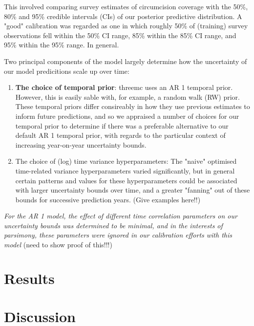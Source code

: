 \documentclass{article}
\begin{document}
This involved comparing survey estimates of circumcision coverage with the 50\%, 80\% and 95\% credible intervals (CIs) of our posterior predictive distribution. A "good" calibration
was regarded as one in which roughly 50\% of (training) survey observations fell within the 50\% CI range, 85\% within the 85\% CI range, and 95\% within the 95\% range. In general.

Two principal components of the model largely determine how the uncertainty of our model predicitions scale up over time: 
\begin{enumerate}
\item \textbf{The choice of temporal prior}: threemc uses an AR 1 temporal prior. However, this is easily sable with, for example, a random walk (RW) prior. These temporal priors
differ consireably in how they use previous estimates to inform future predictions, and so we appraised a number of choices for our temporal prior to determine if there
was a preferable alternative to our default AR 1 temporal prior, with regards to the particular context of increasing year-on-year uncertainty bounds.
\item The choice of (log) time variance hyperparameters: The "naive" optimised time-related variance hyperparameters varied significantly, but in general certain patterns and values
for these hyperparameters could be associated with larger uncertainty bounds over time, and a greater "fanning" out of these bounds for successive prediction years. (Give
examples here!!)
\end{enumerate}

\emph{For the AR 1 model, the effect of different time correlation parameters on our uncertainty bounds was determined to be minimal, and in the interests of parsimony, these parameters were}
\emph{ignored in our calibration efforts with this model} (need to show proof of this!!!)

\section*{Results}
\label{sec:org0ad58a5}

\section*{}
\label{sec:org4d19a77}

\section*{Discussion}
\label{sec:org69af492}
\end{document}
